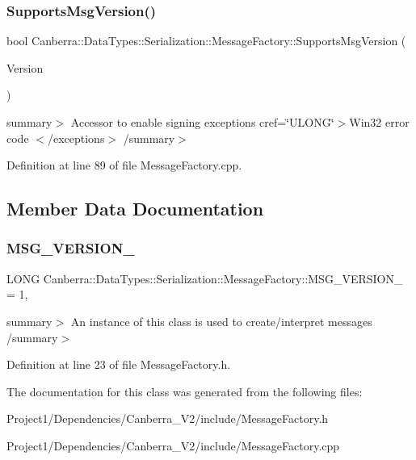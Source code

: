 \subsubsection{\texorpdfstring{Supports\+Msg\+Version()}{SupportsMsgVersion()}}
{\footnotesize\ttfamily bool Canberra\+::\+Data\+Types\+::\+Serialization\+::\+Message\+Factory\+::\+Supports\+Msg\+Version (\begin{DoxyParamCaption}\item[{const L\+O\+NG}]{Version }\end{DoxyParamCaption})\hspace{0.3cm}{\ttfamily [static]}}

summary$>$ Accessor to enable signing exceptions cref=\char`\"{}\+U\+L\+O\+N\+G\char`\"{}$>$Win32 error code $<$/exceptions$>$ /summary$>$ 

Definition at line 89 of file Message\+Factory.\+cpp.



\subsection{Member Data Documentation}
\mbox{\label{class_canberra_1_1_data_types_1_1_serialization_1_1_message_factory_ae6f7663a578514f13d57031c407077ce_ae6f7663a578514f13d57031c407077ce}} 
\subsubsection{\texorpdfstring{M\+S\+G\+\_\+\+V\+E\+R\+S\+I\+O\+N\+\_}{MSG\_VERSION\_1}}
{\footnotesize\ttfamily L\+O\+NG Canberra\+::\+Data\+Types\+::\+Serialization\+::\+Message\+Factory\+::\+M\+S\+G\+\_\+\+V\+E\+R\+S\+I\+O\+N\+\_ = 1\hspace{0.3cm}{\ttfamily [static]}, {\ttfamily [protected]}}

summary$>$ An instance of this class is used to create/interpret messages /summary$>$ 

Definition at line 23 of file Message\+Factory.\+h.



The documentation for this class was generated from the following files\+:\begin{DoxyCompactItemize}
\item 
Project1/\+Dependencies/\+Canberra\+\_\+\+V2/include/Message\+Factory.\+h\item 
Project1/\+Dependencies/\+Canberra\+\_\+\+V2/include/Message\+Factory.\+cpp\end{DoxyCompactItemize}
